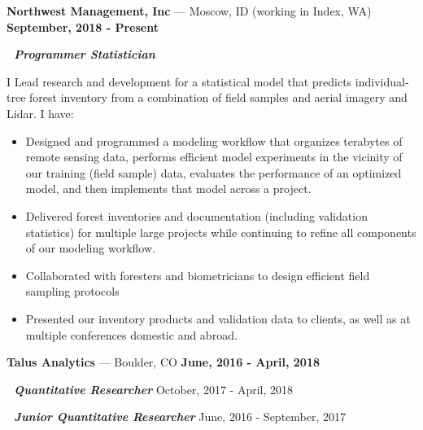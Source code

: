 \documentclass[10pt]{article} %
\begin{document}
\begin{small}

\noindent
\textbf{Northwest Management, Inc} ---  Moscow, ID (working in Index, WA) \hfill \textbf{September, 2018 - Present}$\,$

\noindent
\,\,
\textbf{\textit{Programmer Statistician}} 

\noindent
I Lead research and development for a statistical model that predicts individual-tree forest inventory from a combination of field samples and aerial imagery and Lidar. I have:

\begin{itemize}[leftmargin = .35in,     noitemsep]
\item Designed and programmed a modeling workflow that organizes terabytes of remote sensing data, performs efficient
model experiments in the vicinity of our training (field sample) data, evaluates the performance of an optimized model,
and then implements that model across a project. 
\item Delivered forest inventories and documentation (including validation statistics) for multiple large projects while
continuing to refine all components of our modeling workflow. 
\item Collaborated with foresters and biometricians to design efficient field sampling protocols 
\item Presented our inventory products and validation data to clients, as well as at multiple conferences domestic and abroad.
\end{itemize}

\vspace{1mm}
\noindent
\textbf{Talus Analytics} --- Boulder, CO  \hfill \textbf{June,  2016 - April, 2018}

\noindent
\,\,
\textbf{\textit{Quantitative Researcher}}  \hfill October,  2017 - April, 2018$\,$

\noindent
\,\,
\textbf{\textit{Junior Quantitative Researcher}} \hfill June, 2016 - September, 2017$\,$


\end{small}
\end{document}
